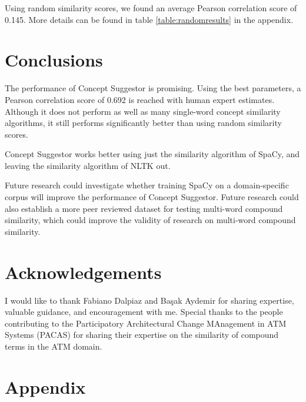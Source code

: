 \documentclass{article}
\begin{document}
Using random similarity scores, we found an average Pearson correlation score of 0.145. More details can be found in table \ref{table:randomresults} in the appendix.

\section{Conclusions} \label{sec:conclusions}

The performance of Concept Suggestor is promising. Using the best parameters, a Pearson correlation score of 0.692 is reached with human expert estimates. Although it does not perform as well as many single-word concept similarity algorithms, it still performs significantly better than using random similarity scores. 

Concept Suggestor works better using just the similarity algorithm of SpaCy, and leaving the similarity algorithm of NLTK out.

Future research could investigate whether training SpaCy on a domain-specific corpus will improve the performance of Concept Suggestor. Future research could also establish a more peer reviewed dataset for testing multi-word compound similarity, which could improve the validity of research on multi-word compound similarity.

\section{Acknowledgements} \label{sec:ack}

I would like to thank Fabiano Dalpiaz and Ba\c sak Aydemir for sharing expertise, valuable guidance, and encouragement with me. Special thanks to the people contributing to the Participatory Architectural Change MAnagement in ATM Systems (PACAS) for sharing their expertise on the similarity of compound terms in the ATM domain.

\printbibliography

\section{Appendix}
\end{document}
